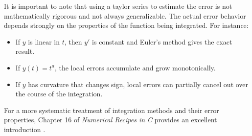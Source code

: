     It is important to note that using a taylor series to estimate the error is not mathematically rigorous and not always generalizable. The actual error behavior depends strongly on the properties of the function being integrated. For instance:
    \begin{itemize}
        \item If \( y \) is linear in \( t \), then \( y' \) is constant and Euler's method gives the exact result.
        \item If \( y(t) = t^a \), the local errors accumulate and grow monotonically.
        \item If \( y \) has curvature that changes sign, local errors can partially cancel out over the course of the integration.
    \end{itemize}
    For a more systematic treatment of integration methods and their error properties, Chapter 16 of \textit{Numerical Recipes in C} provides an excellent introduction \parencite{1992nrca.book.....P}.

